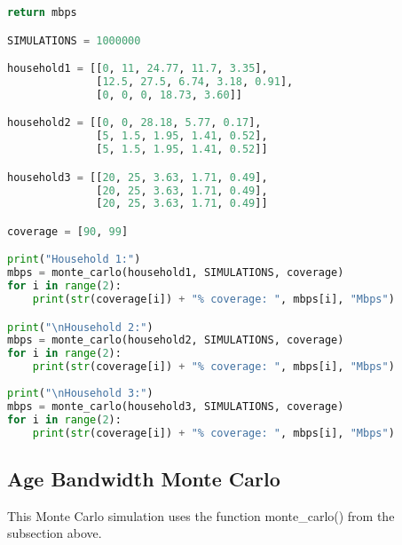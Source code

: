 \documentclass[12pt]{article}
\begin{document}
\begin{lstlisting}[language=Python]
    return mbps

SIMULATIONS = 1000000

household1 = [[0, 11, 24.77, 11.7, 3.35],
              [12.5, 27.5, 6.74, 3.18, 0.91],
              [0, 0, 0, 18.73, 3.60]]

household2 = [[0, 0, 28.18, 5.77, 0.17],
              [5, 1.5, 1.95, 1.41, 0.52],
              [5, 1.5, 1.95, 1.41, 0.52]]

household3 = [[20, 25, 3.63, 1.71, 0.49],
              [20, 25, 3.63, 1.71, 0.49],
              [20, 25, 3.63, 1.71, 0.49]]

coverage = [90, 99]

print("Household 1:")
mbps = monte_carlo(household1, SIMULATIONS, coverage)
for i in range(2):
    print(str(coverage[i]) + "% coverage: ", mbps[i], "Mbps")

print("\nHousehold 2:")
mbps = monte_carlo(household2, SIMULATIONS, coverage)
for i in range(2):
    print(str(coverage[i]) + "% coverage: ", mbps[i], "Mbps")
    
print("\nHousehold 3:")
mbps = monte_carlo(household3, SIMULATIONS, coverage)
for i in range(2):
    print(str(coverage[i]) + "% coverage: ", mbps[i], "Mbps")
\end{lstlisting}

\subsection{Age Bandwidth Monte Carlo}

This Monte Carlo simulation uses the function monte\_carlo() from the  subsection above.
\end{document}
